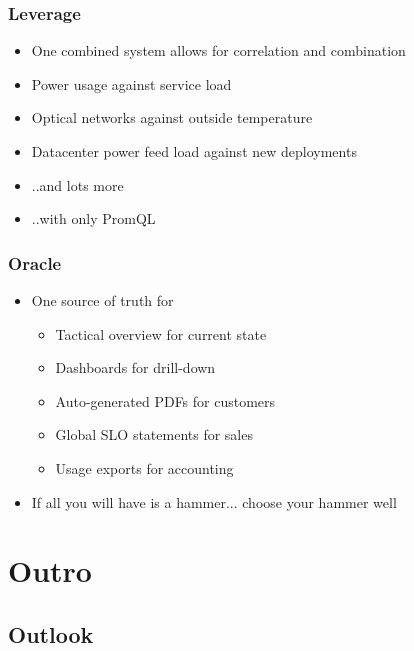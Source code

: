 \documentclass[t]{beamer}
\begin{document}
\begin{frame}
	\frametitle{Leverage}
	\begin{itemize}
		\item One combined system allows for correlation and combination
		\item Power usage against service load
		\item Optical networks against outside temperature
		\item Datacenter power feed load against new deployments
		\item ..and lots more
		\item ..with only PromQL
	\end{itemize}
\end{frame}

\begin{frame}
	\frametitle{Oracle}
	\begin{itemize}
		\item One source of truth for
		\begin{itemize}
			\item Tactical overview for current state
			\item Dashboards for drill-down
			\item Auto-generated PDFs for customers
			\item Global SLO statements for sales
			\item Usage exports for accounting
		\end{itemize}
	\item If all you will have is a hammer... choose your hammer well
	\end{itemize}
\end{frame}


\section{Outro}


\subsection{Outlook}
\end{document}
